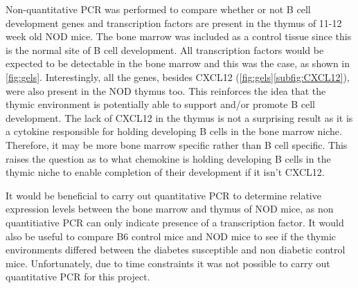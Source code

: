 Non-quantitative PCR was performed to compare whether or not B cell development genes and transcription factors are present in the thymus of 11-12 week old NOD mice.
The bone marrow was included as a control tissue since this is the normal site of B cell development.
All transcription factors would be expected to be detectable in the bone marrow and this was the case, as shown in \cref{fig:gels}.
Interestingly, all the genes, besides CXCL12 (\cref{fig:gels}\ref{subfig:CXCL12}), were also present in the NOD thymus too.
This reinforces the idea that the thymic environment is potentially able to support and/or promote B cell development.
The lack of CXCL12 in the thymus is not a surprising result as it is a cytokine responsible for holding developing B cells in the bone marrow niche. Therefore, it may be more bone marrow specific rather than B cell specific.
This raises the question as to what chemokine is holding developing B cells in the thymic niche to enable completion of their development if it isn't CXCL12.

It would be beneficial to carry out quantitative PCR to determine relative expression levels between the bone marrow and thymus of NOD mice, as non quantitiative PCR can only indicate presence of a transcription factor.
It would also be useful to compare B6 control mice and NOD mice to see if the thymic environments differed between the diabetes susceptible and non diabetic control mice.
Unfortunately, due to time constraints it was not possible to carry out quantitative PCR for this project.

